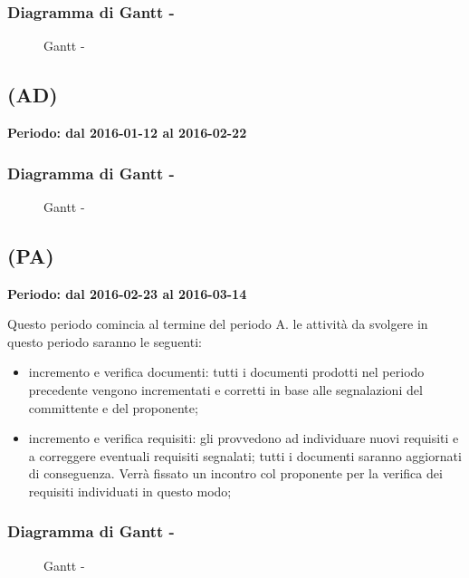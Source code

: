 \documentclass[./PianoDiProgetto.tex]{subfiles}
\begin{document}
  \subsubsection{Diagramma di Gantt - \PerAR}
    \begin{figure}[!h]
    \centering
    \caption{Gantt - \PerAR}
    \end{figure}

	\subsection{\PerAD{} (AD)}
  \textbf{Periodo: dal 2016-01-12 al 2016-02-22}

  \subsubsection{Diagramma di Gantt - \PerAD}
    \begin{figure}[!h]
    \centering
    \caption{Gantt - \PerAD}
    \end{figure}

  \subsection{\PerPA{} (PA)}
  \textbf{Periodo: dal 2016-02-23 al 2016-03-14}

  Questo periodo comincia al termine del periodo A.  le attività da svolgere in questo periodo saranno le seguenti:
  \begin{itemize}
    \item incremento e verifica documenti: tutti i documenti prodotti nel periodo precedente vengono incrementati e corretti in base alle segnalazioni del committente e del proponente;
    \item incremento e verifica requisiti:  gli \ANP provvedono ad individuare nuovi requisiti e a correggere eventuali requisiti segnalati; tutti i documenti saranno aggiornati di conseguenza. Verrà fissato un incontro col proponente per la verifica dei requisiti individuati in questo modo;
  \end{itemize}
  \subsubsection{Diagramma di Gantt - \PerPA}
    \begin{figure}[!h]
    \centering
    \caption{Gantt - \PerPA}
    \end{figure}
\end{document}
